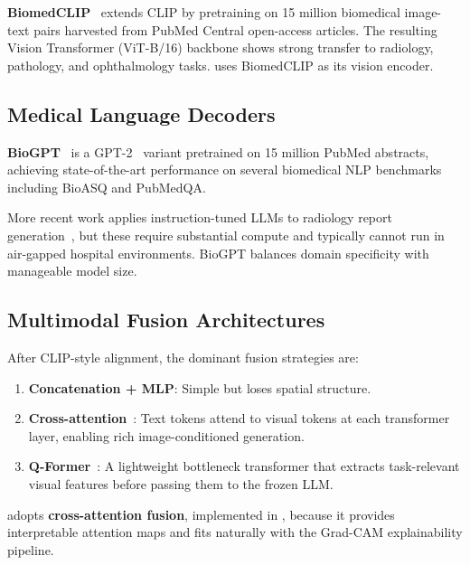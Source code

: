 \textbf{BiomedCLIP}~\citep{zhang2023biomedclip} extends CLIP by pretraining
on 15 million biomedical image-text pairs harvested from PubMed Central
open-access articles. The resulting Vision Transformer (ViT-B/16) backbone
shows strong transfer to radiology, pathology, and ophthalmology tasks.
\medxplain{} uses BiomedCLIP as its vision encoder.

\subsection{Medical Language Decoders}
\label{subsec:llm}

\textbf{BioGPT}~\citep{luo2022biogpt} is a GPT-2~\citep{radford2019gpt2}
variant pretrained on 15 million PubMed abstracts, achieving state-of-the-art
performance on several biomedical NLP benchmarks including BioASQ and PubMedQA.

More recent work applies instruction-tuned LLMs to radiology
report generation~\citep{lee2023llava,li2023llavamedical}, but these
require substantial compute and typically cannot run in air-gapped hospital
environments. BioGPT balances domain specificity with manageable model size.

\subsection{Multimodal Fusion Architectures}
\label{subsec:fusion}

After CLIP-style alignment, the dominant fusion strategies are:
\begin{enumerate}
  \item \textbf{Concatenation + MLP}: Simple but loses spatial structure.
  \item \textbf{Cross-attention}~\citep{alayrac2022flamingo}: Text tokens
        attend to visual tokens at each transformer layer, enabling rich
        image-conditioned generation.
  \item \textbf{Q-Former}~\citep{li2023blip2}: A lightweight bottleneck
        transformer that extracts task-relevant visual features before
        passing them to the frozen LLM.
\end{enumerate}

\medxplain{} adopts \textbf{cross-attention fusion}, implemented in
, because it provides
interpretable attention maps and fits naturally with the Grad-CAM
explainability pipeline.

